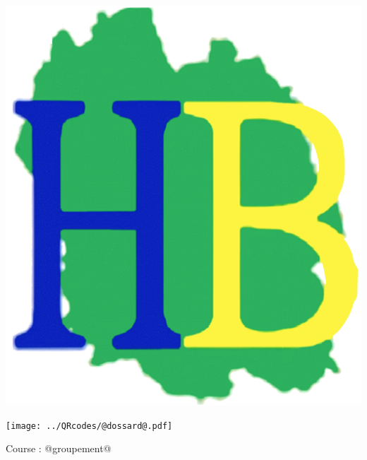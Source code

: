 \Huge

\begin{block} %
{}\hfill {}
{}\hfill {}
\begin{minipage}{0.15\linewidth}
\includegraphics[width=\textwidth]{../logo-HB.png}
\end{minipage}
{}\hfill {}



\begin{minipage}{0.48\linewidth}
\texttt{[image: ../QRcodes/@dossard@.pdf]}

\vspace{0.5cm}

Course : @groupement@
\end{minipage}
\begin{minipage}{0.5\linewidth}
{}\hfill {}
{}\hfill {}


\end{minipage}
\end{block}
